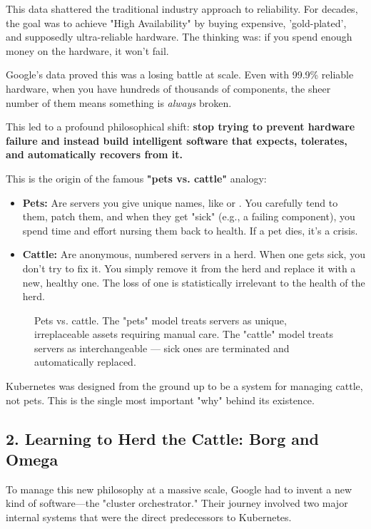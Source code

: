 This data shattered the traditional industry approach to reliability. For decades, the goal was to achieve "High Availability" by buying expensive, 'gold-plated', and supposedly ultra-reliable hardware. The thinking was: if you spend enough money on the hardware, it won't fail.

Google's data proved this was a losing battle at scale. Even with 99.9\% reliable hardware, when you have hundreds of thousands of components, the sheer number of them means something is \textit{always} broken.

This led to a profound philosophical shift: \textbf{stop trying to prevent hardware failure and instead build intelligent software that expects, tolerates, and automatically recovers from it.}

This is the origin of the famous \textbf{"pets vs. cattle"} analogy:
\begin{itemize}
\item \textbf{Pets:} Are servers you give unique names, like  or . You carefully tend to them, patch them, and when they get "sick" (e.g., a failing component), you spend time and effort nursing them back to health. If a pet dies, it's a crisis.
\item \textbf{Cattle:} Are anonymous, numbered servers in a herd. When one gets sick, you don't try to fix it. You simply remove it from the herd and replace it with a new, healthy one. The loss of one is statistically irrelevant to the health of the herd.
\end{itemize}
\begin{figure}[htbp]
\centering

\caption{Pets vs. cattle. The "pets" model treats servers as unique, irreplaceable assets requiring manual care. The "cattle" model treats servers as interchangeable --- sick ones are terminated and automatically replaced.}
\label{fig:4_2}
\end{figure}



Kubernetes was designed from the ground up to be a system for managing cattle, not pets. This is the single most important "why" behind its existence.


\subsection{2. Learning to Herd the Cattle: Borg and Omega}


To manage this new philosophy at a massive scale, Google had to invent a new kind of software---the "cluster orchestrator." Their journey involved two major internal systems that were the direct predecessors to Kubernetes.

